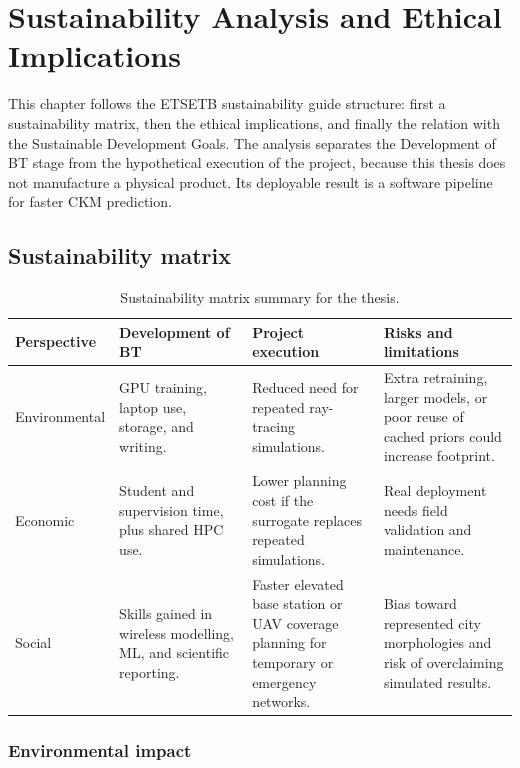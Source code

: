 \chapter{Sustainability Analysis and Ethical Implications}

This chapter follows the ETSETB sustainability guide structure: first a
sustainability matrix, then the ethical implications, and finally the relation
with the Sustainable Development Goals. The analysis separates the Development
of BT stage from the hypothetical execution of the project, because this thesis
does not manufacture a physical product. Its deployable result is a software
pipeline for faster CKM prediction.

\section{Sustainability matrix}

\begin{table}[ht]
\centering
\caption{Sustainability matrix summary for the thesis.}
\label{tab:sustainability_matrix}
\begin{tabularx}{\textwidth}{lXXX}
\toprule
Perspective & Development of BT & Project execution & Risks and limitations \\
\midrule
Environmental &
GPU training, laptop use, storage, and writing. &
Reduced need for repeated ray-tracing simulations. &
Extra retraining, larger models, or poor reuse of cached priors could increase footprint. \\
Economic &
Student and supervision time, plus shared HPC use. &
Lower planning cost if the surrogate replaces repeated simulations. &
Real deployment needs field validation and maintenance. \\
Social &
Skills gained in wireless modelling, ML, and scientific reporting. &
Faster elevated base station or UAV coverage planning for temporary or
emergency networks. &
Bias toward represented city morphologies and risk of overclaiming simulated results. \\
\bottomrule
\end{tabularx}
\end{table}

\subsection{Environmental impact}

